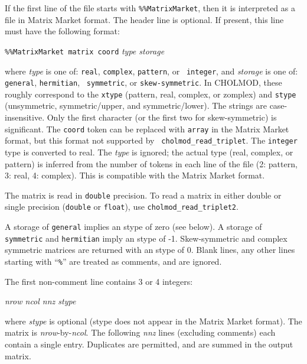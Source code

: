 \documentclass[11pt]{article}
\begin{document}
If the first line of the file starts with {\tt \%\%MatrixMarket}, then it is
interpreted as a file in Matrix Market format.  The header line is optional.
If present, this line must have the following format:
\vspace{0.1in}

        {\tt \%\%MatrixMarket matrix coord} {\em type storage}

\vspace{0.1in}
\noindent
where {\em type} is one of: {\tt real}, {\tt complex}, {\tt pattern}, or {\tt
integer}, and {\em storage} is one of: {\tt general}, {\tt hermitian}, {\tt
symmetric}, or {\tt skew-symmetric}.  In CHOLMOD, these roughly correspond to
the {\tt xtype} (pattern, real, complex, or zomplex) and {\tt stype}
(unsymmetric, symmetric/upper, and symmetric/lower).  The strings are
case-insensitive.  Only the first character (or the first two for
skew-symmetric) is significant.  The {\tt coord} token can be replaced with
{\tt array} in the Matrix Market format, but this format not supported by {\tt
cholmod\_read\_triplet}.  The {\tt integer} type is converted to real.  The
{\em type} is ignored; the actual type (real, complex, or pattern) is inferred
from the number of tokens in each line of the file (2: pattern, 3: real, 4:
complex).  This is compatible with the Matrix Market format.

The matrix is read in {\tt double} precision.  To read a matrix
in either double or single precision ({\tt double} or {\tt float}),
use \verb'cholmod_read_triplet2'.

A storage of {\tt general} implies an stype of zero (see below).  A storage of
{\tt symmetric} and {\tt hermitian} imply an stype of -1.  Skew-symmetric and
complex symmetric matrices are returned with an stype of 0.  Blank lines, any
other lines starting with ``{\tt \%}'' are treated as comments, and are
ignored.

The first non-comment line contains 3 or 4 integers:
\vspace{0.1in}

        {\em nrow ncol nnz stype}

\vspace{0.1in}
\noindent
where {\em stype} is optional (stype does not appear in the Matrix Market
format).  The matrix is {\em nrow}-by-{\em ncol}.  The following {\em nnz}
lines (excluding comments) each contain a single entry.  Duplicates are
permitted, and are summed in the output matrix.
\end{document}
